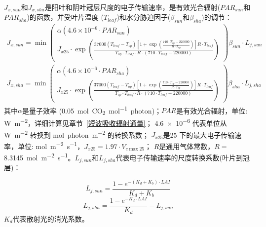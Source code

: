 $J_{x,sun}$和$J_{x,sha}$是阳叶和阴叶冠层尺度的电子传输速率，是有效光合辐射($PAR_{sun}$和$PAR_{sha}$)的函数，并受叶片温度 ($T_{leaf}$)和水分胁迫因子($\beta_{sun}$和$\beta_{sha}$)的调节：
\begin{equation}
\begin{aligned}
J_{x,sun}=\min \left(\begin{array}{c} \alpha\left(4.6 \times 10^{-6} \cdot PAR_{sun}\right) \\
  J_{x25} \cdot \exp\left(\frac{37000\left(T_{{leaf }}-T_{o p}\right)\left[1+\exp\left(\frac{710 \cdot T_{o p}-220000}
 {R \cdot T_{o p}}\right)\right]R \cdot T_{{leaf}}}{T_{o p} \cdot T_{{leaf }} \cdot R 
 \cdot \left(710 \cdot T_{{leaf }}-220000\right)}\right)  \end{array} \right) \beta_{sun} \cdot L_{j,sun} 
\end{aligned}
\end{equation}
\begin{equation}
\begin{aligned}
J_{x,sha}=\min \left(\begin{array}{c} \alpha\left(4.6 \times 10^{-6} \cdot PAR_{sha}\right) \\
  J_{x25} \cdot \exp\left(\frac{37000\left(T_{{leaf }}-T_{o p}\right)\left[1+\exp\left(\frac{710 \cdot T_{o p}-220000}
 {R \cdot T_{o p}}\right)\right]R \cdot T_{{leaf}}}{T_{o p} \cdot T_{{leaf }} \cdot R 
 \cdot \left(710 \cdot T_{{leaf }}-220000\right)}\right)  \end{array} \right) \beta_{sha} \cdot L_{j,sha} 
\end{aligned}
\end{equation}
其中$\alpha$是量子效率 (\qty{0.05}{mol.CO_2.mol^{-1}.photon})；$PAR$是有效光合辐射，单位: \unit{W.m^{-2}}，详细计算见章节~\ref{短波吸收辐射通量}；
\num{4.6e-6} 代表单位从 \unit{W.m^{-2}} 转换到 \unit{mol.photon.m^{-2}} 的转换系数；
$J_{x25}$是25 \textcelsius 下的最大电子传输速率，单位: \unit{mol.m^{-2}.s^{-1}}，$J_{x25}=1.97 \cdot V_{c \max 25}$； 
$R$是通用气体常数，$R=$ \qty{8.3145}{mol.m^{-2}.s^{-1}}。$L_{j,sun}$和$L_{j,sha}$代表电子传输速率的尺度转换系数(叶片到冠层)：

\begin{equation}\label{L_jsun}
L_{j,sun}=\frac{1-e^{-\left(K_{d}+K_{b}\right) \cdot LAI}}{K_{d}+K_{b}}
\end{equation}
\begin{equation}\label{L_jsha}
L_{j,sha}=\frac{1-e^{-K_{d}\cdot LAI}}{K_{d}} - L_{j,sun}
\end{equation}
$K_{d}$代表散射光的消光系数。

